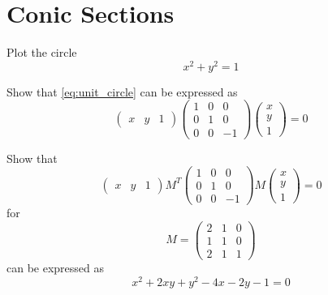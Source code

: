 \documentclass[journal,12pt,twocolumn]{IEEEtran}
\begin{document}
\section{Conic Sections}
\begin{problem}
\label{prob:unit_circle}
Plot the circle 
\begin{equation}
\label{eq:unit_circle}
x^2+y^2=1
\end{equation}
\end{problem}
\solution

\begin{problem}
Show that \eqref{eq:unit_circle} can be expressed as
\begin{equation}
\begin{pmatrix}
x & y & 1
\end{pmatrix}
\begin{pmatrix}
1 & 0 & 0
\\
0 & 1 & 0
\\
0 & 0 & -1
\end{pmatrix}
\begin{pmatrix}
x
\\
y
\\
1
\end{pmatrix}
= 0
\end{equation}
\end{problem}
\begin{problem}
\label{prob:circle_parabola}
Show that
\begin{equation}
\begin{pmatrix}
x & y & 1
\end{pmatrix}
M^{T}
\begin{pmatrix}
1 & 0 & 0
\\
0 & 1 & 0
\\
0 & 0 & -1
\end{pmatrix}
M
\begin{pmatrix}
x
\\
y
\\
1
\end{pmatrix}
= 0
\end{equation}
for
\begin{equation}
M = 
\begin{pmatrix}
2 & 1 & 0
\\
1 & 1 & 0
\\
2 & 1 & 1
\end{pmatrix}
\end{equation}
can be expressed as
\begin{equation}
\label{eq:parabola_projection}
x^2+2xy+y^2 - 4x - 2y -1 = 0	
\end{equation}
\end{problem}
\end{document}
